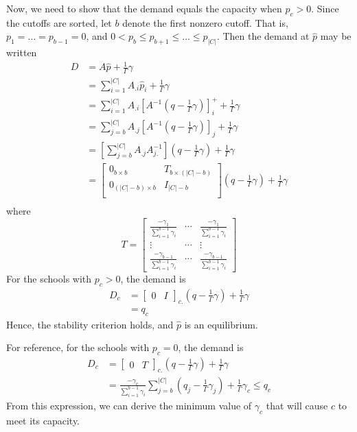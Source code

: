 \documentclass[12pt]{article}
\theoremstyle{definition}
\begin{document}
Now, we need to show that the demand equals the capacity when $p_c > 0$. Since the cutoffs are sorted, let $b$ denote the first nonzero cutoff. That is, $p_1 = \dots = p_{b-1} = 0$, and $0 < p_b \leq p_{b+1} \leq \dots \leq p_{|C|}$. Then the demand at $\hat p$ may be written
\begin{align}
D &= A \hat p + \frac{1}{\Gamma}\gamma \\
&= \sum_{i=1}^{|C|} A_{.i} \hat p_i + \frac{1}{\Gamma}\gamma  \\
&= \sum_{i=1}^{|C|} A_{.i} \left[A^{-1} \left(q - \frac{1}{\Gamma}\gamma\right) \right]_i^+ + \frac{1}{\Gamma}\gamma  \\
&= \sum_{j=b}^{|C|} A_{.j} \left[A^{-1} \left(q - \frac{1}{\Gamma}\gamma\right) \right]_j + \frac{1}{\Gamma}\gamma  \\
&= \left[\sum_{j=b}^{|C|} A_{.j} A_{j.}^{-1} \right] \left(q - \frac{1}{\Gamma}\gamma\right) + \frac{1}{\Gamma}\gamma  \\
&= \begin{bmatrix}
0_{b \times b} & T_{b \times (|C| - b)} \\
0_{(|C| - b) \times b} & I_{|C| - b} \\
\end{bmatrix} \left(q - \frac{1}{\Gamma}\gamma\right) + \frac{1}{\Gamma}\gamma  \\
\end{align}
where
\[T = \begin{bmatrix}
\frac{-\gamma_1}{\sum_{i=1}^{b-1} \gamma_i} & \cdots & \frac{-\gamma_1}{\sum_{i=1}^{b-1} \gamma_i} \\
\vdots & \cdots & \vdots \\
\frac{-\gamma_{b-1}}{\sum_{i=1}^{b-1} \gamma_i} & \cdots & \frac{-\gamma_{b-1}}{\sum_{i=1}^{b-1} \gamma_i}
\end{bmatrix}\]
For the schools with $p_c > 0$, the demand is
\begin{align}
D_c &=
\begin{bmatrix}
0& I
\end{bmatrix}_{c.} \left(q - \frac{1}{\Gamma}\gamma\right) + \frac{1}{\Gamma}\gamma \\
&= q_c
\end{align}
Hence, the stability criterion holds, and $\hat p$ is an equilibrium.

For reference, for the schools with $p_c = 0$, the demand is 
\begin{align}
D_c &=
\begin{bmatrix}
0& T
\end{bmatrix}_{c.} \left(q - \frac{1}{\Gamma}\gamma\right) + \frac{1}{\Gamma}\gamma  \\
&= \frac{-\gamma_c}{\sum_{i=1}^{b-1} \gamma_i} \sum_{j=b}^{|C|} \left(q_j - \frac{1}{\Gamma}\gamma_j\right)  + \frac{1}{\Gamma}\gamma_c \leq q_c
\end{align}
From this expression, we can derive the minimum value of $\gamma_c$ that will cause $c$ to meet its capacity. 
\end{document}

